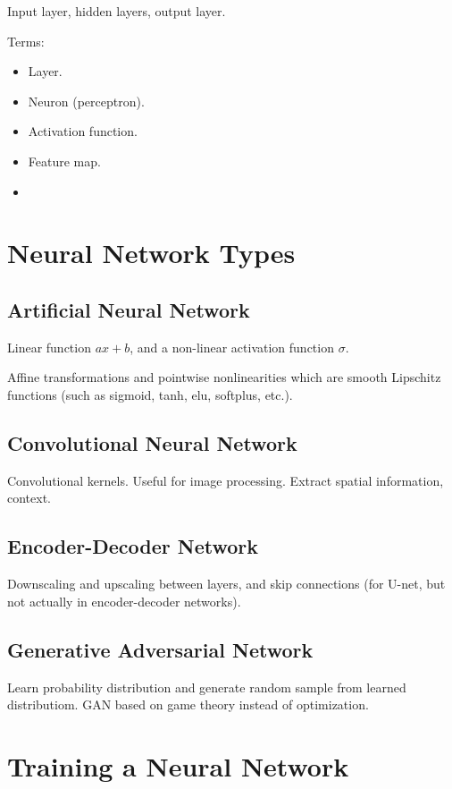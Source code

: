 
Input layer, hidden layers, output layer. 

Terms:
\begin{itemize}
    \item Layer.
    \item Neuron (perceptron).
    \item Activation function.
    \item Feature map.
    \item 
\end{itemize}

\section{Neural Network Types}


\subsection{Artificial Neural Network}
Linear function $ax+b$, and a non-linear activation function $\sigma$. 

Affine transformations and pointwise nonlinearities which are smooth Lipschitz functions (such as sigmoid, tanh, elu, softplus, etc.). 

\subsection{Convolutional Neural Network}
Convolutional kernels. Useful for image processing. Extract spatial information, context. 

\subsection{Encoder-Decoder Network}
Downscaling and upscaling between layers, and skip connections (for U-net, but not actually in encoder-decoder networks). %

\subsection{Generative Adversarial Network}
Learn probability distribution and generate random sample from learned distributiom. 
GAN based on game theory instead of optimization. 

\section{Training a Neural Network}


